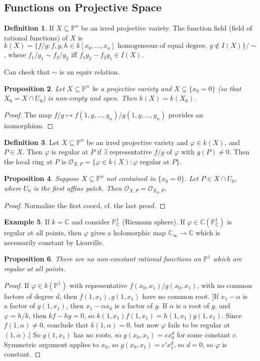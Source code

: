 \documentclass{article}
\theoremstyle{definition}
\newtheorem{defn}{Definition}[section]
\newtheorem{example}[defn]{Example}
\theoremstyle{remark}
\theoremstyle{plain}
\newtheorem{prop}[defn]{Proposition}
\newcommand{\CC}{\mathbb{C}}
\newcommand{\PP}{\mathbb{P}}
\begin{document}
\subsection{Functions on Projective Space}
\begin{defn}
    If $X\subseteq\PP^n$ be an irred projective variety. The function field (field of rational functions) of $X$ is $k(X)=\{f/g:f,g,h\in k[x_0,...,x_n]\text{ homogeneous of equal degree},\ g\notin I(X)\}/\sim$, where $f_1/g_1\sim f_2/g_2$ iff $f_1g_2-f_2g_1\in I(X)$.
\end{defn}
Can check that $\sim$ is an equiv relation.
\begin{prop}
    Let $X\subseteq\PP^n$ be a projective variety and $X\subsetneq\{x_0=0\}$ (so that $X_0=X\cap U_0$) is non-empty and open. Then $k(X)=k(X_0)$.
\end{prop}
\begin{proof}
    The map $f/g\mapsto f(1,y,...,y_n)/g(1,y,...,y_n)$ provides an isomorphism.
\end{proof}
\begin{defn}
    Let $X\subseteq\PP^n$ be an irred projective variety and $\varphi\in k(X)$, and $P\in X$. Then $\varphi$ is regular at $P$ if $\exists$ representative $f/g$ of $\varphi$ with $g(P)\neq 0$. Then the local ring at $P$ is $\mathcal O_{X,P}=\{\varphi\in k(X):\varphi\text{ regular at }P\}$. 
\end{defn}
\begin{prop}
    Suppose $X\subseteq \PP^n$ not contained in $\{x_0=0\}$. Let $P\in X\cap U_0$, where $U_0$ is the first affine patch. Then $\mathcal O_{X,P}=\mathcal O_{X_0,P}$.
\end{prop}
\begin{proof}
    Normalize the first coord, cf. the last proof.
\end{proof}
\begin{example}
    If $k=\CC$ and consider $\PP^1_{\CC}$ (Riemann sphere). If $\varphi\in \CC(\PP^1_\CC)$ is regular at all points, then $\varphi$ gives a holomorphic map $\CC_\infty\to\CC$ which is necessarily constant by Liouville.
\end{example}
\begin{prop}
    There are no non-constant rational functions on $\PP^1$ which are regular at all points.
\end{prop}
\begin{proof}
    If $\varphi\in k(\PP^1)$ with representative $f(x_0,x_1)/g(x_0,x_1)$, with no common factors of degree $d$, then $f(1,x_1),g(1,x_1)$ have no common root. [If $x_1-\alpha$ is a factor of $g(1,x_1)$, then $x_1-\alpha x_0$ is a factor of $g$. If $\alpha$ is a root of $g$, and $\varphi=h/k$, then $kf-hg=0$, so $k(1,x_1)f(1,x_1)=h(1,x_1)g(1,x_1)$. Since $f(1,\alpha)\neq 0$, conclude that $k(1,\alpha)=0$, but now $\varphi$ fails to be regular at $(1,\alpha)$.] So $g(1,x_1)$ has no roots, so $g(x_0,x_1)=cx_0^d$ for some constant $c$. Symmetric argument applies to $x_0$, so $g(x_0,x_1)=c'x_1^d$, so $d=0$, so $\varphi$ is constant.
\end{proof}
\end{document}
